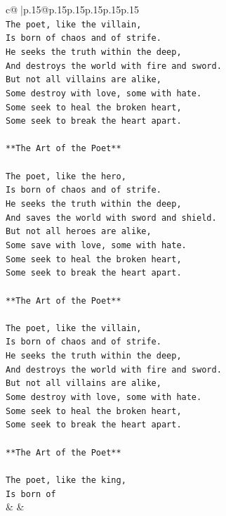 \documentclass{article}
\begin{document}
{\begin{supertabular}{c@{$\;$}|p{.15\linewidth}@{}p{.15\linewidth}p{.15\linewidth}p{.15\linewidth}p{.15\linewidth}p{.15\linewidth}}
{{{\\ 
\texttt{The poet, like the villain,} \\
\texttt{Is born of chaos and of strife.} \\
\texttt{He seeks the truth within the deep,} \\
\texttt{And destroys the world with fire and sword.} \\
\texttt{But not all villains are alike,} \\
\texttt{Some destroy with love, some with hate.} \\
\texttt{Some seek to heal the broken heart,} \\
\texttt{Some seek to break the heart apart.} \\
\\ 
\texttt{**The Art of the Poet**} \\
\\ 
\texttt{The poet, like the hero,} \\
\texttt{Is born of chaos and of strife.} \\
\texttt{He seeks the truth within the deep,} \\
\texttt{And saves the world with sword and shield.} \\
\texttt{But not all heroes are alike,} \\
\texttt{Some save with love, some with hate.} \\
\texttt{Some seek to heal the broken heart,} \\
\texttt{Some seek to break the heart apart.} \\
\\ 
\texttt{**The Art of the Poet**} \\
\\ 
\texttt{The poet, like the villain,} \\
\texttt{Is born of chaos and of strife.} \\
\texttt{He seeks the truth within the deep,} \\
\texttt{And destroys the world with fire and sword.} \\
\texttt{But not all villains are alike,} \\
\texttt{Some destroy with love, some with hate.} \\
\texttt{Some seek to heal the broken heart,} \\
\texttt{Some seek to break the heart apart.} \\
\\ 
\texttt{**The Art of the Poet**} \\
\\ 
\texttt{The poet, like the king,} \\
\texttt{Is born of} \\
            }
        }
    }
    & & \\ \\


\end{supertabular}}
\end{document}
